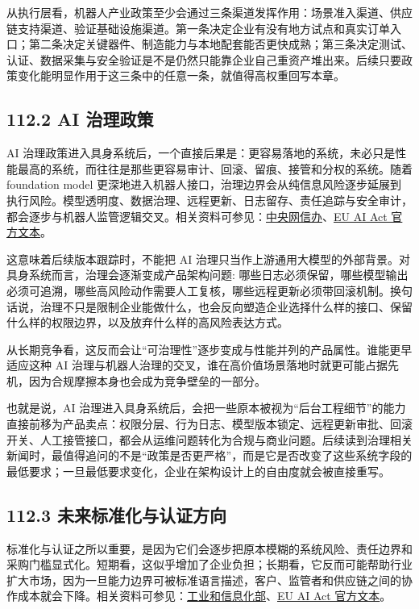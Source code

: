 从执行层看，机器人产业政策至少会通过三条渠道发挥作用：场景准入渠道、供应链支持渠道、验证基础设施渠道。第一条决定企业有没有地方试点和真实订单入口；第二条决定关键器件、制造能力与本地配套能否更快成熟；第三条决定测试、认证、数据采集与安全验证是不是仍然只能靠企业自己重资产堆出来。后续只要政策变化能明显作用于这三条中的任意一条，就值得高权重回写本章。

\subsection*{112.2 AI 治理政策}


AI 治理政策进入具身系统后，一个直接后果是：更容易落地的系统，未必只是性能最高的系统，而往往是那些更容易审计、回滚、留痕、接管和分权的系统。随着 foundation model 更深地进入机器人接口，治理边界会从纯信息风险逐步延展到执行风险。模型透明度、数据治理、远程更新、日志留存、责任追踪与安全审计，都会逐步与机器人监管逻辑交叉。相关资料可参见：\href{https://www.cac.gov.cn/}{中央网信办}、\href{https://data.europa.eu/eli/reg/2024/1689/oj}{EU AI Act 官方文本}。

这意味着后续版本跟踪时，不能把 AI 治理只当作上游通用大模型的外部背景。对具身系统而言，治理会逐渐变成产品架构问题: 哪些日志必须保留，哪些模型输出必须可追溯，哪些高风险动作需要人工复核，哪些远程更新必须带回滚机制。换句话说，治理不只是限制企业能做什么，也会反向塑造企业选择什么样的接口、保留什么样的权限边界，以及放弃什么样的高风险表达方式。

从长期竞争看，这反而会让“可治理性”逐步变成与性能并列的产品属性。谁能更早适应这种 AI 治理与机器人治理的交叉，谁在高价值场景落地时就更可能占据先机，因为合规摩擦本身也会成为竞争壁垒的一部分。

也就是说，AI 治理进入具身系统后，会把一些原本被视为“后台工程细节”的能力直接前移为产品卖点：权限分层、行为日志、模型版本锁定、远程更新审批、回滚开关、人工接管接口，都会从运维问题转化为合规与商业问题。后续读到治理相关新闻时，最值得追问的不是“政策是否更严格”，而是它是否改变了这些系统字段的最低要求；一旦最低要求变化，企业在架构设计上的自由度就会被直接重写。

\subsection*{112.3 未来标准化与认证方向}


标准化与认证之所以重要，是因为它们会逐步把原本模糊的系统风险、责任边界和采购门槛显式化。短期看，这似乎增加了企业负担；长期看，它反而可能帮助行业扩大市场，因为一旦能力边界可被标准语言描述，客户、监管者和供应链之间的协作成本就会下降。相关资料可参见：\href{https://www.miit.gov.cn/}{工业和信息化部}、\href{https://data.europa.eu/eli/reg/2024/1689/oj}{EU AI Act 官方文本}。

